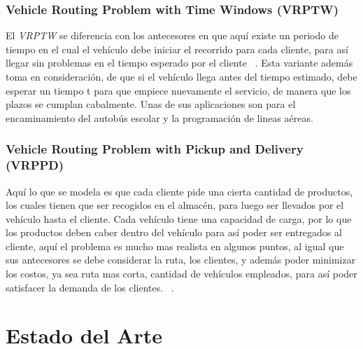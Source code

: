 \documentclass[letter, 10pt]{article}
\begin{document}
\subsubsection{Vehicle Routing Problem with Time Windows (VRPTW)}

El \emph{VRPTW} se diferencia con los antecesores en que aqu\'i existe un periodo de tiempo en el cual el veh\'iculo debe iniciar el recorrido para
cada cliente, para as\'i llegar sin problemas en el tiempo esperado por el cliente ~\cite{journals/eor/AziGP07}.
Esta variante adem\'as toma en consideraci\'on, de que si el veh\'iculo llega antes del tiempo estimado, debe esperar un tiempo t para que empiece
nuevamente el servicio, de manera que los plazos se cumplan cabalmente. Unas de sus aplicaciones son para el encaminamiento del autob\'us escolar y
la programaci\'on de lineas a\'ereas.
\newpage

\subsubsection{Vehicle Routing Problem with Pickup and Delivery (VRPPD)}

Aqu\'i lo que se modela es que cada cliente pide una cierta cantidad de productos, los cuales tienen que ser recogidos en el almac\'en, para luego ser
llevados por el veh\'iculo hasta el cliente. Cada veh\'iculo tiene una capacidad de carga, por lo que los productos deben caber dentro del veh\'iculo
para as\'i poder ser entregados al cliente, aqu\'i el problema es mucho mas realista en algunos puntos, al igual que sus antecesores se debe considerar 
la ruta, los clientes, y adem\'as poder minimizar los costos, ya sea ruta mas corta, cantidad de veh\'iculos empleados, para as\'i poder satisfacer 
la demanda de los clientes.
~\cite{EilamTzoreff2002193}.

\newpage
\section{Estado del Arte}
\end{document}
